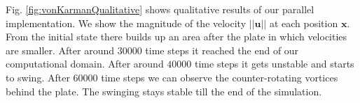 \documentclass[a4paper,11pt, footsepline]{book}
\begin{document}
Fig. \ref{fig:vonKarmanQualitative} shows qualitative results of our parallel implementation. We show the magnitude of the velocity $||\mathbf{u}||$ at each position $\mathbf{x}$. From the initial state there builds up an area after the plate in which velocities are smaller. After around $30000$ time steps it reached the end of our computational domain. After around $40000$ time steps it gets unstable and starts to swing. After $60000$ time steps we can observe the counter-rotating vortices behind the plate. The swinging stays stable till the end of the simulation.
\begin{figure}
  \begin{center}

\end{center}
\end{figure}
\end{document}
